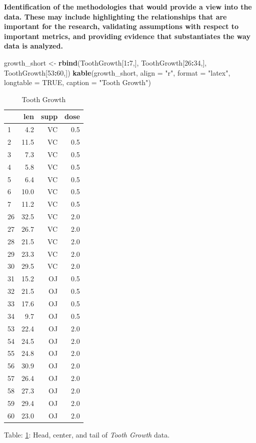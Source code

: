 \documentclass[12pt,oneside]{chicagocapstone}
\newenvironment{Shaded}{\begin{snugshade}}{\end{snugshade}}
\newcommand{\DataTypeTok}[1]{\textcolor[rgb]{0.13,0.29,0.53}{#1}}
\newcommand{\DecValTok}[1]{\textcolor[rgb]{0.00,0.00,0.81}{#1}}
\newcommand{\KeywordTok}[1]{\textcolor[rgb]{0.13,0.29,0.53}{\textbf{#1}}}
\newcommand{\NormalTok}[1]{#1}
\newcommand{\OperatorTok}[1]{\textcolor[rgb]{0.81,0.36,0.00}{\textbf{#1}}}
\newcommand{\OtherTok}[1]{\textcolor[rgb]{0.56,0.35,0.01}{#1}}
\newcommand{\StringTok}[1]{\textcolor[rgb]{0.31,0.60,0.02}{#1}}
\begin{document}
\textbf{Identification of the methodologies that would provide a view into the data. These may include highlighting the relationships that are important for the research, validating assumptions with respect to important metrics, and providing evidence that substantiates the way data is analyzed.}
\begin{Shaded}
\begin{Highlighting}[]
\NormalTok{growth_short <-}\StringTok{ }\KeywordTok{rbind}\NormalTok{(ToothGrowth[}\DecValTok{1}\OperatorTok{:}\DecValTok{7}\NormalTok{,], ToothGrowth[}\DecValTok{26}\OperatorTok{:}\DecValTok{34}\NormalTok{,], ToothGrowth[}\DecValTok{53}\OperatorTok{:}\DecValTok{60}\NormalTok{,])}
\KeywordTok{kable}\NormalTok{(growth_short, }\DataTypeTok{align =} \StringTok{"r"}\NormalTok{, }\DataTypeTok{format =} \StringTok{"latex"}\NormalTok{, }
      \DataTypeTok{longtable =} \OtherTok{TRUE}\NormalTok{, }\DataTypeTok{caption =} \StringTok{"Tooth Growth"}\NormalTok{)}
\end{Highlighting}
\end{Shaded}
\begin{longtable}[t]{l|r|r|r}
\caption{\label{tab:datatable}Tooth Growth}\\
\hline
  & len & supp & dose\\
\hline
1 & 4.2 & VC & 0.5\\
\hline
2 & 11.5 & VC & 0.5\\
\hline
3 & 7.3 & VC & 0.5\\
\hline
4 & 5.8 & VC & 0.5\\
\hline
5 & 6.4 & VC & 0.5\\
\hline
6 & 10.0 & VC & 0.5\\
\hline
7 & 11.2 & VC & 0.5\\
\hline
26 & 32.5 & VC & 2.0\\
\hline
27 & 26.7 & VC & 2.0\\
\hline
28 & 21.5 & VC & 2.0\\
\hline
29 & 23.3 & VC & 2.0\\
\hline
30 & 29.5 & VC & 2.0\\
\hline
31 & 15.2 & OJ & 0.5\\
\hline
32 & 21.5 & OJ & 0.5\\
\hline
33 & 17.6 & OJ & 0.5\\
\hline
34 & 9.7 & OJ & 0.5\\
\hline
53 & 22.4 & OJ & 2.0\\
\hline
54 & 24.5 & OJ & 2.0\\
\hline
55 & 24.8 & OJ & 2.0\\
\hline
56 & 30.9 & OJ & 2.0\\
\hline
57 & 26.4 & OJ & 2.0\\
\hline
58 & 27.3 & OJ & 2.0\\
\hline
59 & 29.4 & OJ & 2.0\\
\hline
60 & 23.0 & OJ & 2.0\\
\hline
\end{longtable}
Table: \ref{tab:datatable}: Head, center, and tail of \emph{Tooth Growth} data.
\end{document}
